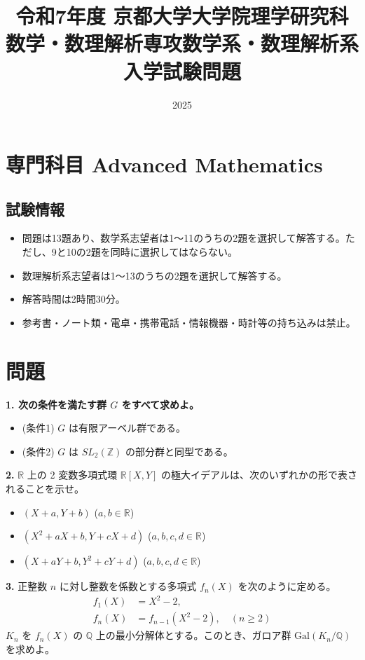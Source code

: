 \documentclass{article}
\begin{document}
\title{令和7年度 京都大学大学院理学研究科 数学・数理解析専攻\newline 数学系・数理解析系 入学試験問題}
\author{}
\date{2025}
\maketitle

\section*{専門科目 Advanced Mathematics}

\subsection*{試験情報}
\begin{itemize}
    \item 問題は13題あり、数学系志望者は1〜11のうちの2題を選択して解答する。ただし、9と10の2題を同時に選択してはならない。
    \item 数理解析系志望者は1〜13のうちの2題を選択して解答する。
    \item 解答時間は2時間30分。
    \item 参考書・ノート類・電卓・携帯電話・情報機器・時計等の持ち込みは禁止。
\end{itemize}

\section*{問題}
\textbf{1. 次の条件を満たす群 $G$ をすべて求めよ。}
\begin{itemize}
    \item (条件1) $G$ は有限アーベル群である。
    \item (条件2) $G$ は $SL_2(\mathbb{Z})$ の部分群と同型である。
\end{itemize}

\textbf{2.} $\mathbb{R}$ 上の 2 変数多項式環 $\mathbb{R}[X,Y]$ の極大イデアルは、次のいずれかの形で表されることを示せ。
\begin{itemize}
    \item $(X + a, Y + b)$ ($a, b \in \mathbb{R}$)
    \item $(X^2 + aX + b, Y + cX + d)$ ($a, b, c, d \in \mathbb{R}$)
    \item $(X + aY + b, Y^2 + cY + d)$ ($a, b, c, d \in \mathbb{R}$)
\end{itemize}

\textbf{3.} 正整数 $n$ に対し整数を係数とする多項式 $f_n(X)$ を次のように定める。
\begin{align*}
    f_1(X) &= X^2 - 2, \\
    f_n(X) &= f_{n-1}(X^2 - 2), \quad (n \geq 2)
\end{align*}
$K_n$ を $f_n(X)$ の $\mathbb{Q}$ 上の最小分解体とする。このとき、ガロア群 $\text{Gal}(K_n/\mathbb{Q})$ を求めよ。
\end{document}
